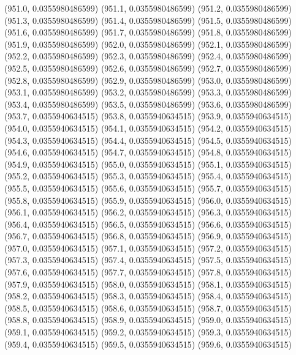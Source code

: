 {					(951.0, 0.0355980486599)
					(951.1, 0.0355980486599)
					(951.2, 0.0355980486599)
					(951.3, 0.0355980486599)
					(951.4, 0.0355980486599)
					(951.5, 0.0355980486599)
					(951.6, 0.0355980486599)
					(951.7, 0.0355980486599)
					(951.8, 0.0355980486599)
					(951.9, 0.0355980486599)
					(952.0, 0.0355980486599)
					(952.1, 0.0355980486599)
					(952.2, 0.0355980486599)
					(952.3, 0.0355980486599)
					(952.4, 0.0355980486599)
					(952.5, 0.0355980486599)
					(952.6, 0.0355980486599)
					(952.7, 0.0355980486599)
					(952.8, 0.0355980486599)
					(952.9, 0.0355980486599)
					(953.0, 0.0355980486599)
					(953.1, 0.0355980486599)
					(953.2, 0.0355980486599)
					(953.3, 0.0355980486599)
					(953.4, 0.0355980486599)
					(953.5, 0.0355980486599)
					(953.6, 0.0355980486599)
					(953.7, 0.0355940634515)
					(953.8, 0.0355940634515)
					(953.9, 0.0355940634515)
					(954.0, 0.0355940634515)
					(954.1, 0.0355940634515)
					(954.2, 0.0355940634515)
					(954.3, 0.0355940634515)
					(954.4, 0.0355940634515)
					(954.5, 0.0355940634515)
					(954.6, 0.0355940634515)
					(954.7, 0.0355940634515)
					(954.8, 0.0355940634515)
					(954.9, 0.0355940634515)
					(955.0, 0.0355940634515)
					(955.1, 0.0355940634515)
					(955.2, 0.0355940634515)
					(955.3, 0.0355940634515)
					(955.4, 0.0355940634515)
					(955.5, 0.0355940634515)
					(955.6, 0.0355940634515)
					(955.7, 0.0355940634515)
					(955.8, 0.0355940634515)
					(955.9, 0.0355940634515)
					(956.0, 0.0355940634515)
					(956.1, 0.0355940634515)
					(956.2, 0.0355940634515)
					(956.3, 0.0355940634515)
					(956.4, 0.0355940634515)
					(956.5, 0.0355940634515)
					(956.6, 0.0355940634515)
					(956.7, 0.0355940634515)
					(956.8, 0.0355940634515)
					(956.9, 0.0355940634515)
					(957.0, 0.0355940634515)
					(957.1, 0.0355940634515)
					(957.2, 0.0355940634515)
					(957.3, 0.0355940634515)
					(957.4, 0.0355940634515)
					(957.5, 0.0355940634515)
					(957.6, 0.0355940634515)
					(957.7, 0.0355940634515)
					(957.8, 0.0355940634515)
					(957.9, 0.0355940634515)
					(958.0, 0.0355940634515)
					(958.1, 0.0355940634515)
					(958.2, 0.0355940634515)
					(958.3, 0.0355940634515)
					(958.4, 0.0355940634515)
					(958.5, 0.0355940634515)
					(958.6, 0.0355940634515)
					(958.7, 0.0355940634515)
					(958.8, 0.0355940634515)
					(958.9, 0.0355940634515)
					(959.0, 0.0355940634515)
					(959.1, 0.0355940634515)
					(959.2, 0.0355940634515)
					(959.3, 0.0355940634515)
					(959.4, 0.0355940634515)
					(959.5, 0.0355940634515)
					(959.6, 0.0355940634515)
}
